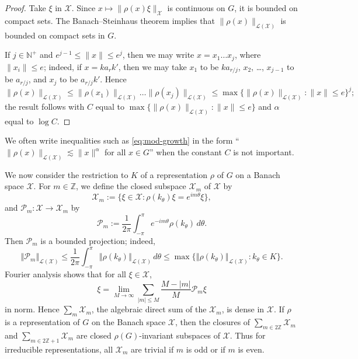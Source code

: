 \documentclass[12pt,a4paper]{amsart}
\theoremstyle{definition}
\theoremstyle{remark}
\numberwithin{equation}{section}
\newcommand{\norm}[1]{\left\Vert#1\right\Vert}
\newcommand{\N}{\mathbb{N}}
\newcommand{\Z}{\mathbb{Z}}
\newcommand{\Ban}{\mathcal{X}}
\newcommand{\rep}{\rho}
\begin{document}
\begin{proof}
Take $\xi$ in $\Ban$. 
Since $x \mapsto \| \rho(x) \xi \|_{\Ban}$ is continuous on $G$, it is bounded on compact sets.
The Banach--Steinhaus theorem implies that $\| \rho(x) \|_{\mathcal{L}(\mathcal{X})}$ is bounded on compact sets in $G$.


If $j \in \N^+$ and $e^{j-1} \leq \|x\| \leq e^j$, then we may write $x =x_1 \dots x_j$, where $\|x_i\| \leq e$; indeed, if $x = k a_r k'$,  then we may take $x_1$ to be $k a_{r/j}$, $x_2$, \dots, $x_{j-1}$ to be $a_{r/j}$, and $x_j$ to be $a_{r/j}k'$.  
Hence
\[
\|\rho(x) \|_{\mathcal{L}(\mathcal{X})} 
\leq \|\rho(x_1) \|_{\mathcal{L}(\mathcal{X})} \dots \|\rho(x_j) \|_{\mathcal{L}(\mathcal{X})} 
\leq \max\{ \|\rho(x)\|_{\mathcal{L}(\mathcal{X})} : \|x\| \leq e\}^{j} ;
\]
the result follows with $C$ equal to $\max\{ \|\rho(x)\|_{\mathcal{L}(\mathcal{X})} : \|x\| \leq e\}$ and $\alpha$ equal to $\log C$.
\end{proof}

We often write inequalities such as \eqref{eq:mod-growth}  in the form ``$\| \rep(x) \|_{\mathcal{L}(\mathcal{X})} \lesssim \|x\|^\alpha$ for all $x \in G$'' when the constant $C$ is not important.


We now consider the restriction to $K$ of a representation $\rho$ of $G$  on a Banach space $\Ban$.
For $m \in \Z$, we define the closed subspace $\Ban_m$ of $\Ban$ by
\[
\Ban_{m} := \{ \xi \in \Ban : \rep(k_\theta)\xi = e^{im\theta}\xi \} ,
\]
and $\mathcal{P}_m :\Ban \to \Ban_m$ by
\begin{equation}
\mathcal{P}_m 
:= \frac{1}{2\pi} \int_{-\pi}^{\pi} e^{-im\theta} \rep(k_\theta) \,d\theta.
\end{equation}
Then $\mathcal{P}_m$ is a bounded projection; indeed,
\[
\norm{\mathcal{P}_m}_{\mathcal{L}(\mathcal{X})} 
\leq \frac{1}{2\pi} \int_{-\pi}^{\pi} \norm{\rep(k_\theta)}_{\mathcal{L}(\mathcal{X})}  \,d\theta 
\leq \max\{ \norm{ \rho(k_\theta) }_{\mathcal{L}(\Ban)} : k_\theta \in K \}.
\]
{%
Fourier analysis shows that for all $\xi \in \Ban$,
\[
\xi = \lim_{M \to \infty} \sum_{|m| \leq M}  \frac{M - |m|}{M} \mathcal{P}_m \xi
\]
in norm. 
Hence $\sum_{m} \Ban_m$, the algebraic direct sum of the $\Ban_m$, is dense in $\Ban$.}
If $\rep$ is a representation of $G$ on the Banach space $\Ban$, then the closures of $\sum_{m \in 2\Z} \Ban_m$ and $\sum_{m \in 2\Z+1} \Ban_m$ are closed $\rep(G)$-invariant subspaces of $\Ban$.
Thus for irreducible representations, all $\Ban_m$ are trivial if $m$ is odd or if $m$ is even.
\end{document}
